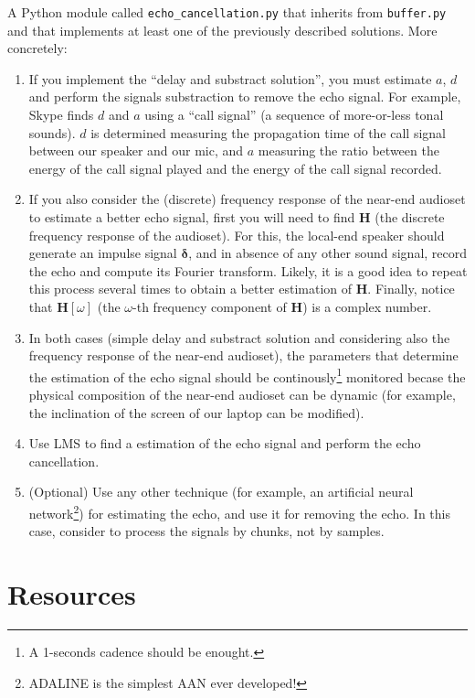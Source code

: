 A Python module called \texttt{echo\_cancellation.py} that inherits from
\texttt{buffer.py} and that implements at least one of the previously
described solutions. More concretely:
\begin{enumerate}
\item If you implement the ``delay and substract solution'', you must
  estimate $a$, $d$ and perform the signals substraction to remove the
  echo signal. For example, Skype finds $d$ and $a$ using a ``call
  signal'' (a sequence of more-or-less tonal sounds). $d$ is
  determined measuring the propagation time of the call signal between
  our speaker and our mic, and $a$ measuring the ratio between the
  energy of the call signal played and the energy of the call signal
  recorded.
\item If you also consider the (discrete) frequency response of the
  near-end audioset to estimate a better echo signal, first you will
  need to find ${\mathbf H}$ (the discrete frequency response of the
  audioset). For this, the local-end speaker should generate an
  impulse signal ${\mathbf \delta}$, and in absence of any other sound
  signal, record the echo and compute its Fourier transform. Likely,
  it is a good idea to repeat this process several times to obtain a
  better estimation of ${\mathbf H}$. Finally, notice that
  ${\mathbf H}[\omega]$ (the $\omega$-th frequency component of
  ${\mathbf H}$) is a complex number.
\item In both cases (simple delay and substract solution and
  considering also the frequency response of the near-end audioset),
  the parameters that determine the estimation of the echo signal
  should be continously\footnote{A 1-seconds cadence should be
    enought.} monitored becase the physical composition of the
  near-end audioset can be dynamic (for example, the inclination of
  the screen of our laptop can be modified).
\item Use LMS to find a estimation of the echo signal and perform the
  echo cancellation.
\item (Optional) Use any other technique (for example, an artificial
  neural network\footnote{ADALINE is the simplest AAN ever
  developed!}) for estimating the echo, and use it for removing the
  echo. In this case, consider to process the signals by chunks, not
  by samples.
\end{enumerate}

\section{Resources}

